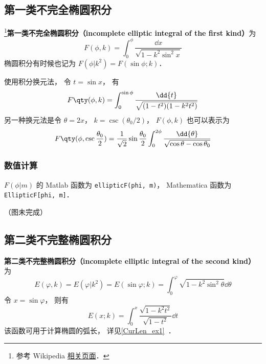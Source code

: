 

\subsection{第一类不完全椭圆积分}
\footnote{参考 Wikipedia \href{https://en.wikipedia.org/wiki/Elliptic_integral}{相关页面}．}\textbf{第一类不完全椭圆积分（incomplete elliptic integral of the first kind）}为
\begin{equation}\label{EliInt_eq1}
F(\phi, k) = \int_0^\phi \frac{\dd{x}}{\sqrt{1 - k^2\sin^2 x}}
\end{equation}
椭圆积分有时候也记为 $F(\phi | k^2) = F(\sin\phi ; k)$．

使用积分换元法， 令 $t = \sin x$， 有
\begin{equation}
F\qty(\phi, k) = \int_0^{\sin{\phi}} \frac{\dd{t}}{\sqrt{(1 - t^2)(1 - k^2 t^2)}}
\end{equation}
另一种换元法是令 $\theta = 2x$， $k = \csc(\theta_0/2)$， $F(\phi, k)$ 也可以表示为
\begin{equation}\label{EliInt_eq2}
F\qty(\phi, \csc\frac{\theta_0}{2}) = \frac{1}{\sqrt{2}} \sin\frac{\theta_0}{2} \int_0^{2\phi} \frac{\dd{\theta}}{\sqrt{\cos\theta - \cos\theta_0}}
\end{equation}

\subsubsection{数值计算}
$F(\phi | m)$ 的 Matlab 函数为 \verb|ellipticF(phi, m)|， %
Mathematica 函数为 \verb|EllipticF[phi, m]|．

（图未完成）

\subsection{第二类不完整椭圆积分}
\textbf{第二类不完整椭圆积分（incomplete elliptic integral of the second kind）}为
\begin{equation}\label{EliInt_eq3}
E(\varphi, k) = E(\varphi | k^2) = E(\sin\varphi; k) = \int_0^\varphi \sqrt{1 - k^2\sin^2\theta} \dd{\theta}
\end{equation}
令 $x = \sin\varphi$， 则有
\begin{equation}
E(x; k) = \int_0^x \frac{\sqrt{1 - k^2t^2}}{\sqrt{1 - t^2}}\dd{t}
\end{equation}
该函数可用于计算椭圆的弧长， 详见\autoref{CurLen_ex1}~．

